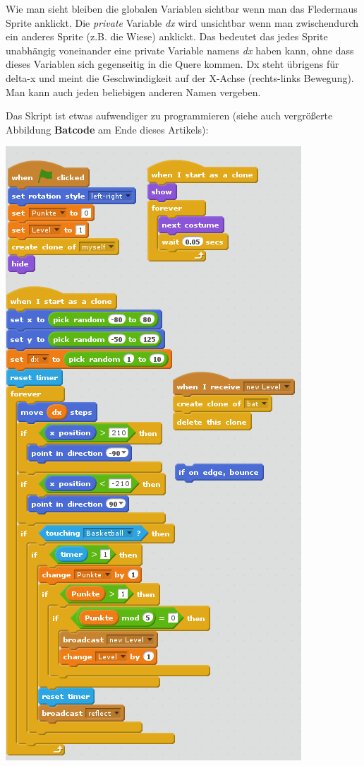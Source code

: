 Wie man sieht bleiben die globalen Variablen sichtbar wenn man das Fledermaus Sprite anklickt. Die \textit{private} Variable \textit{dx} wird unsichtbar wenn man zwischendurch ein anderes Sprite (z.B. die Wiese) anklickt. Das bedeutet das jedes Sprite unabhängig voneinander eine private Variable namens \textit{dx} haben kann, ohne dass dieses Variablen sich gegenseitig in die Quere kommen. Dx steht übrigens für delta-x und meint die Geschwindigkeit auf der X-Achse (rechts-links Bewegung). Man kann auch jeden beliebigen anderen Namen vergeben.

Das Skript ist etwas aufwendiger zu programmieren (siehe auch vergrößerte Abbildung \textbf{Batcode} am Ende dieses Artikels):

\begin{center}
\includegraphics[width=\linewidth]{scratch/fbatcode.png}

\end{center}
